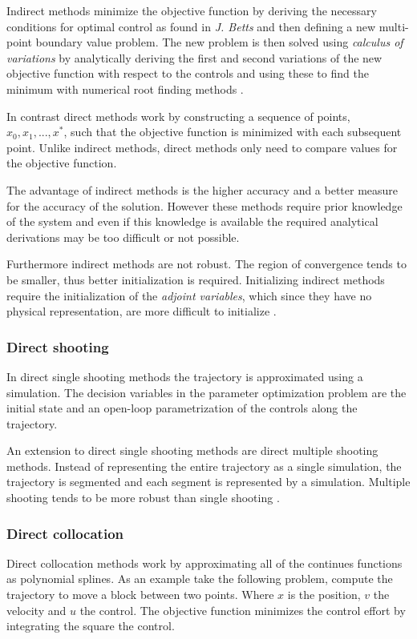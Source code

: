 Indirect methods minimize the objective function by deriving the necessary conditions for optimal control as found in \emph{J. Betts} \cite{betts2010practical} and then defining a new multi-point boundary value problem. The new problem is then solved using \emph{calculus of
variations} by analytically deriving the first and second variations of the new objective function with respect to the controls and using these to find the minimum with numerical root finding methods \cite{betts2010practical, von1992direct, kelly2017introduction}.

In contrast direct methods work by constructing a sequence of points, $x_0, x_1,...,x^*$, such that the objective function is minimized with each subsequent point. Unlike indirect methods, direct methods only need to compare values for the objective function.

The advantage of indirect methods is the higher accuracy and a better measure for the accuracy of the solution. However these methods require prior knowledge of the system and even if this knowledge is available the required analytical derivations may be too difficult or not possible. 

Furthermore indirect methods are not robust. The region of convergence tends to be smaller, thus better initialization is required. Initializing indirect methods require the initialization of the \emph{adjoint variables}, which since they have no physical representation, are more difficult to initialize \cite{kelly2017introduction, betts2010practical}.

\subsubsection{Direct shooting}
In direct single shooting methods the trajectory is approximated using a simulation. The decision variables in the parameter optimization problem are the initial state and an open-loop parametrization of the controls along the trajectory.

An extension to direct single shooting methods are direct multiple shooting methods. Instead of representing the entire trajectory as a single simulation, the trajectory is segmented and each segment is represented by a simulation. Multiple shooting tends to be more robust than single shooting \cite{kelly2017introduction}.

\subsubsection{Direct collocation}
Direct collocation methods work by approximating all of the continues functions as polynomial splines. As an example take the following problem, compute the trajectory to move a block between two points. Where $x$ is the position, $v$ the velocity and $u$ the control. The objective function minimizes the control effort by integrating the square the control.

